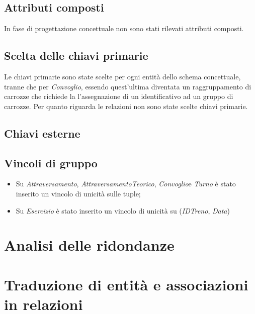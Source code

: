 \documentclass[a4paper,12pt]{report}
\begin{document}
	\subsection{Attributi composti}
	\par In fase di progettazione concettuale non sono stati rilevati attributi composti.
	\subsection{Scelta delle chiavi primarie}
	\par Le chiavi primarie sono state scelte per ogni entità dello schema concettuale, tranne che per \textit{Convoglio}, essendo quest'ultima diventata un raggruppamento di carrozze che richiede la l'assegnazione di un identificativo ad un gruppo di carrozze. Per quanto riguarda le relazioni non sono state scelte chiavi primarie.
	\subsection{Chiavi esterne}
	\subsection{Vincoli di gruppo}
	\begin{itemize}
		\item Su \textit{Attraversamento}, \textit{AttraversamentoTeorico}, \textit{Convoglio}e \textit{Turno} è stato inserito un vincolo di unicità sulle tuple;
		\item Su \textit{Esercizio} è stato inserito un vincolo di unicità su (\textit{IDTreno}, \textit{Data})
	\end{itemize}
	\section{Analisi delle ridondanze}
	\section{Traduzione di entità e associazioni in relazioni}
	
\end{document}
